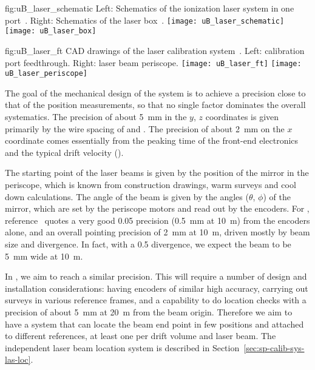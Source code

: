 \begin{dunefigure}{fig:uB_laser_schematic}
{Left: Schematics of the ionization laser system in one port~\cite{Antonello:2015lea}. Right: Schematics of the laser box~\cite{microboone}.}
\texttt{[image: uB\_laser\_schematic]}
\texttt{[image: uB\_laser\_box]}
\end{dunefigure}

\begin{dunefigure}{fig:uB_laser_ft}
{CAD drawings of the  laser calibration system~\cite{microboone}. Left: calibration port feedthrough. Right: laser beam periscope. %
}
\texttt{[image: uB\_laser\_ft]}
\texttt{[image: uB\_laser\_periscope]}
\end{dunefigure}

The goal of the mechanical design of the system is to achieve a precision close to that of the  position measurements, so that no single factor dominates %
the overall systematics. The  precision of about \SI{5}{\milli\m} in the $y$, $z$ coordinates is given primarily by the wire spacing of \uvpitch and \xgpitch. The precision of about \SI{2}{\milli\m} on the $x$ coordinate comes essentially from the \fepeaktime peaking time of the front-end electronics and the typical drift velocity (\driftvelocity).

The starting point of the laser beams is given by the position of the mirror in the periscope, which is known from construction drawings, warm surveys and cool down calculations. The angle of the beam is given by the angles ($\theta$, $\phi$) of the mirror, which are set by the periscope motors and read out by the encoders. 
For , reference~\cite{bib:chen2018} quotes a very good \SI{0.05}{\mrad} precision (\SI{0.5}{\milli\m} at \SI{10}{\m}) from the encoders alone, and an overall pointing precision of \SI{2}{\milli\m} at \SI{10}{\m}, driven mostly by beam size and divergence. In fact, with a \SI{0.5}{\mrad} divergence, we expect the beam to be \SI{5}{\milli\m} wide at \SI{10}{\m}.

In , we aim to reach a similar precision. This will require a number of design and installation considerations: having encoders of similar high accuracy, carrying out surveys in various reference frames, and a capability to do location checks with a precision of about \SI{5}{\milli\m}  at \SI{20}{\m} from the beam origin. Therefore we aim to have a system that can locate the beam end point in few positions and attached to different references, at least one per drift volume and laser beam. 
The independent laser beam location system is described in Section~\ref{sec:sp-calib-sys-las-loc}. 


